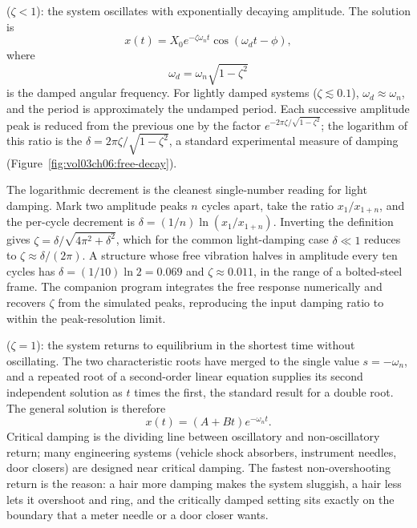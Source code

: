  ($\zeta < 1$): the system oscillates with
exponentially decaying amplitude. The solution is
\[
x(t) = X_0 e^{-\zeta\omega_n t} \cos(\omega_d t - \phi),
\]
where
\[
\omega_d = \omega_n\sqrt{1 - \zeta^2}
\]
is the damped angular frequency. For lightly damped systems
($\zeta \lesssim 0.1$), $\omega_d \approx \omega_n$, and the period
is approximately the undamped period. Each successive amplitude
peak is reduced from the previous one by the factor $e^{-2\pi\zeta/
\sqrt{1-\zeta^2}}$; the logarithm of this ratio is the
 $\delta = 2\pi\zeta/\sqrt{1-\zeta^2}$,
a standard experimental measure of damping
(Figure~\ref{fig:vol03ch06:free-decay}).



The logarithmic decrement is the cleanest single-number reading for
light damping. Mark two amplitude peaks $n$ cycles apart, take the
ratio $x_1/x_{1+n}$, and the per-cycle decrement is $\delta =
(1/n)\ln(x_1/x_{1+n})$. Inverting the definition gives $\zeta =
\delta/\sqrt{4\pi^2 + \delta^2}$, which for the common light-damping
case $\delta \ll 1$ reduces to $\zeta \approx \delta/(2\pi)$. A
structure whose free vibration halves in amplitude every ten cycles
has $\delta = (1/10)\ln 2 = 0.069$ and $\zeta \approx 0.011$, in the
range of a bolted-steel frame. The companion program
 integrates the free response numerically
and recovers $\zeta$ from the simulated peaks, reproducing the input
damping ratio to within the peak-resolution limit.

 ($\zeta = 1$): the system returns to
equilibrium in the shortest time without oscillating. The two
characteristic roots have merged to the single value $s = -\omega_n$,
and a repeated root of a second-order linear equation supplies its
second independent solution as $t$ times the first, the standard result
for a double root. The general solution is therefore
\[
x(t) = (A + Bt) e^{-\omega_n t}.
\]
Critical damping is the dividing line between oscillatory and
non-oscillatory return; many engineering systems (vehicle shock
absorbers, instrument needles, door closers) are designed near
critical damping. The fastest non-overshooting return is the reason: a
hair more damping makes the system sluggish, a hair less lets it
overshoot and ring, and the critically damped setting sits exactly on
the boundary that a meter needle or a door closer wants.

